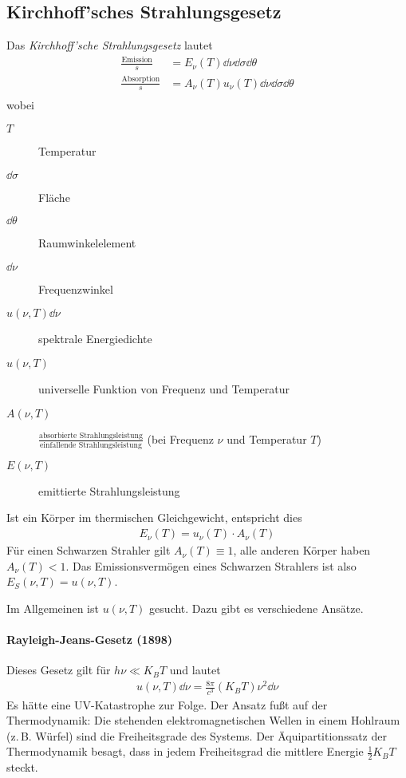 \subsection{Kirchhoff'sches Strahlungsgesetz}%
Das \emph{Kirchhoff'sche Strahlungsgesetz} lautet
\begin{align*}
  \frac{\text{Emission}}{s} &= E_\nu(T) \dd\nu \dd\sigma \dd\theta\\
  \frac{\text{Absorption}}{s} &= A_\nu(T)u_\nu(T) \dd\nu \dd\sigma \dd\theta\\
\end{align*}
wobei
\begin{description}
\item[$T$] Temperatur
\item[$\dd\sigma$] Fläche
\item[$\dd\theta$] Raumwinkelelement
\item[$\dd\nu$] Frequenzwinkel
\item[$u(\nu,T)\dd\nu$] spektrale Energiedichte
\item[$u(\nu,T)$] universelle Funktion von Frequenz und Temperatur
\item[$A(\nu,T)$] 
  $\frac{\text{absorbierte Strahlungsleistung}}
  {\text{einfallende Strahlungsleistung}}$ (bei Frequenz $\nu$ und
  Temperatur $T$)%
\item[$E(\nu,T)$] emittierte Strahlungsleistung
\end{description}
Ist ein Körper im thermischen Gleichgewicht, entspricht dies
\begin{gather*}
  E_\nu(T) = u_\nu(T)\cdot A_\nu(T)
\end{gather*}
Für einen Schwarzen Strahler gilt $A_\nu(T)\equiv 1$, alle anderen
Körper haben $A_\nu(T)<1$. Das Emissionsvermögen eines Schwarzen
Strahlers ist also $E_S(\nu,T) = u(\nu,T)$.

Im Allgemeinen ist $u(\nu,T)$ gesucht. Dazu gibt es verschiedene
Ansätze.

\paragraph{Rayleigh-Jeans-Gesetz (1898)}
Dieses Gesetz gilt für 
$h\nu\ll K_B T$
und lautet
\begin{gather*}
  u(\nu,T)\dd\nu = \frac{8\pi}{c^3}(K_BT)\nu^2\dd\nu
\end{gather*}
Es hätte eine UV-Katastrophe zur Folge.
Der Ansatz fußt auf der Thermodynamik: 
Die stehenden elektromagnetischen Wellen in einem Hohlraum (z.\,B. Würfel)
sind die Freiheitsgrade des Systems. Der Äquipartitionssatz der
Thermodynamik besagt, dass in jedem Freiheitsgrad die mittlere Energie
$\frac{1}{2}K_BT$ steckt.

